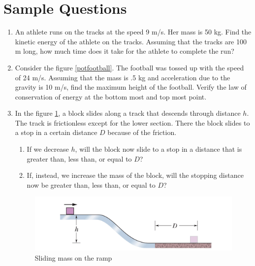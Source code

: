 \documentclass[10pt]{article}
\begin{document}
\section{Sample Questions}
\begin{enumerate}
\item An athlete runs on the tracks at the speed 9 m/s.  Her mass is 50 kg.  Find the kinetic energy of the athlete on the tracks.  Assuming that the tracks are 100 m long, how much time does it take for the athlete to complete the run?
\item Consider the figure \ref{potfootball}.  The football was tossed up with the speed of 24 m/s.  Assuming that the mass is .5 kg and acceleration due to the gravity is 10 m/s, find the maximum height of the football.  Verify the law of conservation of energy at the bottom most and top most point.
\item In the figure \ref{smassramp}, a block slides along a track that descends through distance $h$.  The track is frictionless except for the lower section.  There the block slides to a stop in a certain distance $D$ because of the friction.
  \begin{enumerate}
  \item If we decrease $h$, will the block now slide to a stop in a distance that is greater than, less than, or equal to $D$?
   \item If, instead, we increase the mass of the block, will the stopping distance now be greater than, less than, or equal to $D$?
  \end{enumerate}
\begin{figure}[h]
\includegraphics[scale=1]{slidingmasspot}
\centering
\caption{Sliding mass on the ramp}
\label{smassramp}
\centering
\end{figure}
\end{enumerate}
\end{document}
